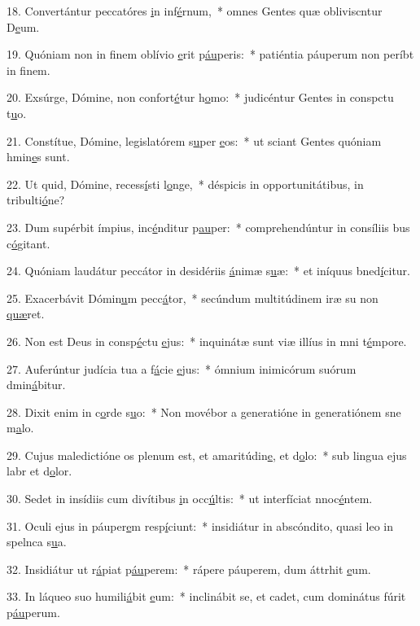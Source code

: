18. Convertántur peccatóres \uline{i}n inf\uline{é}rnum,~* omnes Gentes quæ obliviscntur D\uline{e}um.\par 
19. Quóniam non in finem oblívio \uline{e}rit p\uline{áu}peris:~* patiéntia páuperum non períbt in f\uline{i}nem.\par 
20. Exsúrge, Dómine, non confort\uline{é}tur h\uline{o}mo:~* judicéntur Gentes in conspctu t\uline{u}o.\par 
21. Constítue, Dómine, legislatórem s\uline{u}per \uline{e}os:~* ut sciant Gentes quóniam hmin\uline{e}s sunt.\par 
22. Ut quid, Dómine, recess\uline{í}sti l\uline{o}nge,~* déspicis in opportunitátibus, in tribulti\uline{ó}ne?\par 
23. Dum supérbit ímpius, inc\uline{é}nditur p\uline{au}per:~* comprehendúntur in consíliis bus c\uline{ó}gitant.\par 
24. Quóniam laudátur peccátor in desidériis \uline{á}nimæ s\uline{u}æ:~* et iníquus bned\uline{í}citur.\par 
25. Exacerbávit Dómin\uline{u}m pecc\uline{á}tor,~* secúndum multitúdinem iræ su non \uline{quæ}ret.\par 
26. Non est Deus in consp\uline{é}ctu \uline{e}jus:~* inquinátæ sunt viæ illíus in mni t\uline{é}mpore.\par 
27. Auferúntur judícia tua a f\uline{á}cie \uline{e}jus:~* ómnium inimicórum suórum dmin\uline{á}bitur.\par 
28. Dixit enim in c\uline{o}rde s\uline{u}o:~* Non movébor a generatióne in generatiónem sne m\uline{a}lo.\par 
29. Cujus maledictióne os plenum est, et amaritúdin\uline{e}, et d\uline{o}lo:~* sub lingua ejus labr et d\uline{o}lor.\par 
30. Sedet in insídiis cum divítibus \uline{i}n occ\uline{ú}ltis:~* ut interfíciat nnoc\uline{é}ntem.\par 
31. Oculi ejus in páuper\uline{e}m resp\uline{í}ciunt:~* insidiátur in abscóndito, quasi leo in spelnca s\uline{u}a.\par 
32. Insidiátur ut r\uline{á}piat p\uline{áu}perem:~* rápere páuperem, dum áttrhit \uline{e}um.\par 
33. In láqueo suo humili\uline{á}bit \uline{e}um:~* inclinábit se, et cadet, cum dominátus fúrit p\uline{áu}perum.\par 
